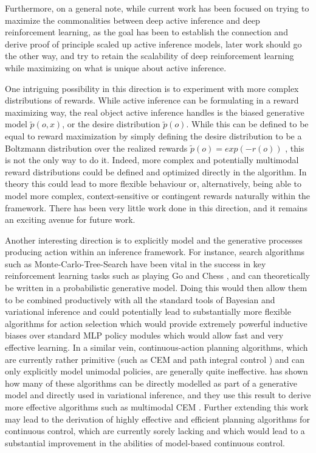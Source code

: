 Furthermore, on a general note, while current work has been focused on trying to maximize the commonalities between deep active inference and deep reinforcement learning, as the goal has been to establish the connection and derive proof of principle scaled up active inference models, later work should go the other way, and try to retain the scalability of deep reinforcement learning while maximizing on what is unique about active inference. 

One intriguing possibility in this direction is to experiment with more complex distributions of rewards. While active inference can be formulating in a reward maximizing way, the real object active inference handles is the biased generative model $\tilde{p}(o,x)$, or the desire distribution $\tilde{p}(o)$. While this can be defined to be equal to reward maximization by simply defining the desire distribution to be a Boltzmann distribution over the realized rewards $\tilde{p}(o) = exp(-r(o))$ \citep{friston2012active}, this is not the only way to do it. Indeed, more complex and potentially multimodal reward distributions could be defined and optimized directly in the algorithm. In theory this could lead to more flexible behaviour or, alternatively, being able to model more complex, context-sensitive or contingent rewards naturally within the framework. There has been very little work done in this direction, and it remains an exciting avenue for future work.

Another interesting direction is to explicitly model and the generative processes producing action within an inference framework. For instance, search algorithms such as Monte-Carlo-Tree-Search have been vital in the success in key reinforcement learning tasks such as playing Go and Chess \citep{silver2017mastering}, and can theoretically be written in a probabilistic generative model. Doing this would then allow them to be combined productively with all the standard tools of Bayesian and variational inference and could potentially lead to substantially more flexible algorithms for action selection which would provide extremely powerful inductive biases over standard MLP policy modules which would allow fast and very effective learning. In a similar vein, continuous-action planning algorithms, which are currently rather primitive (such as CEM \citep{rubinstein1997optimization} and path integral control \citep{kappen2007introduction}) and can only explicitly model unimodal policies, are generally quite ineffective. \citet{okada_variational_2019} has shown how many of these algorithms can be directly modelled as part of a generative model and directly used in variational inference, and they use this result to derive more effective algorithms such as multimodal CEM \citep{okada2020planet}. Further extending this work may lead to the derivation of highly effective and efficient planning algorithms for continuous control, which are currently sorely lacking and which would lead to a substantial improvement in the abilities of model-based continuous control. 

